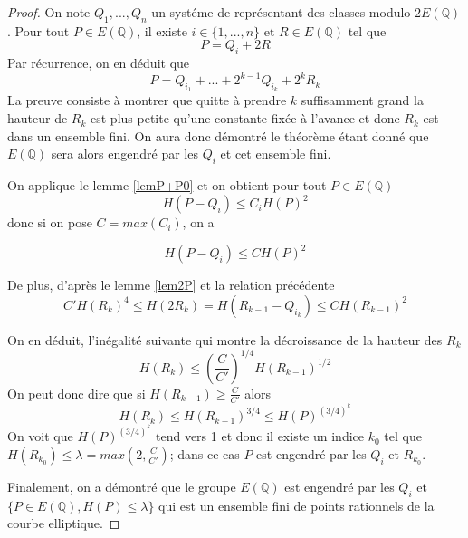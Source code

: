 \documentclass{article}
\begin{document}
\begin{proof}
On note $Q_{1}, ..., Q_{n}$ un systéme de représentant des classes modulo $2E(\mathbb{Q})$.
Pour tout $P \in E(\mathbb{Q})$, il existe $i\in \{1,...,n\}$ et $R\in E(\mathbb{Q})$ tel que
\begin{equation*}
P=Q_{i}+2R
\end{equation*}
Par récurrence, on en déduit que
\begin{equation*}
P=Q_{i_{1}} + ... + 2^{k-1}Q_{i_{k}} + 2^kR_{k}
\end{equation*}
La preuve consiste à montrer que quitte à prendre $k$ suffisamment grand la hauteur de $R_{k}$ est plus petite
qu'une constante fixée à l'avance et donc $R_{k}$ est dans un ensemble fini. On aura donc démontré le théorème
étant donné que $E(\mathbb{Q})$ sera alors engendré par les $Q_{i}$ et cet ensemble fini.

On applique le lemme \ref{lemP+P0} et on obtient pour tout $P\in E(\mathbb{Q})$
\begin{equation*}
H(P-Q_{i}) \leq C_{i}H(P)^2
\end{equation*}
donc si on pose $C=max(C_{i})$, on a

\begin{equation*}
H(P-Q_{i}) \leq CH(P)^2
\end{equation*}

De plus, d'après le lemme \ref{lem2P} et la relation précédente
\begin{equation*}
C'H(R_{k})^4 \leq H(2R_{k}) = H(R_{k-1} - Q_{i_{k}}) \leq CH(R_{k-1})^2
\end{equation*}

On en déduit, l'inégalité suivante qui montre la décroissance de la hauteur des $R_{k}$
\begin{equation*}
H(R_{k}) \leq (\frac{C}{C'})^{1/4}H(R_{k-1})^{1/2}
\end{equation*}
On peut donc dire que si $H(R_{k-1}) \geq \frac{C}{C'}$ alors
\begin{equation*}
H(R_{k}) \leq H(R_{k-1})^{3/4} \leq H(P)^{(3/4)^k}
\end{equation*}
On voit que $H(P)^{(3/4)^k}$ tend vers 1 et donc il existe un indice $k_{0}$ tel que
$H(R_{k_{0}}) \leq \lambda = max(2, \frac{C}{C'})$; dans ce cas $P$ est engendré par les $Q_{i}$ et $R_{k_{0}}$.

Finalement, on a démontré que le groupe $E(\mathbb{Q})$ est engendré par les $Q_{i}$ et 
$\{P\in E(\mathbb{Q}), H(P) \leq \lambda\}$ qui est un ensemble fini de points rationnels de la courbe elliptique.
\end{proof}
\end{document}
